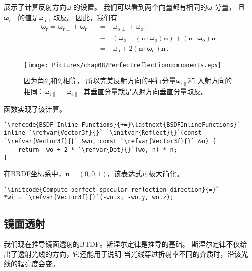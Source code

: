 展示了计算反射方向${\bm\omega}_{\mathrm{r}}$的设置。
我们可以看到两个向量都有相同的${\bm\omega}_{\parallel}$分量，
且${\bm\omega}_{\mathrm{r}\perp}$的值是${\bm\omega}_{\mathrm{o}\perp}$取反。
因此，我们有
\begin{align}
    \label{eq:8.5}
    {\bm\omega}_{\mathrm{r}}={\bm\omega}_{\mathrm{r}\perp}+{\bm\omega}_{\mathrm{r}\parallel} & =-{\bm\omega}_{\mathrm{o}\perp}+{\bm\omega}_{\mathrm{o}\parallel}\nonumber                                                        \\
                                                                                             & =-({\bm\omega}_{\mathrm{o}}-({\bm n}\cdot{\bm\omega}_{\mathrm{o}}){\bm n})+({\bm n}\cdot{\bm\omega}_{\mathrm{o}}){\bm n}\nonumber \\
                                                                                             & =-{\bm\omega}_{\mathrm{o}}+2({\bm n}\cdot{\bm\omega}_{\mathrm{o}}){\bm n}\, .
\end{align}
\begin{figure}[htbp]
    \centering
    \texttt{[image: Pictures/chap08/Perfectreflectioncomponents.eps]}
    \caption{因为角$\theta_{\mathrm{o}}$和$\theta_{\mathrm{r}}$相等，
    所以完美反射方向的平行分量${\bm\omega}_{\mathrm{r}\parallel}$和
    入射方向的相同：${\bm\omega}_{\mathrm{r}\parallel}={\bm\omega}_{\mathrm{o}\parallel}$.
    其垂直分量就是入射方向垂直分量取反。}
    \label{fig:8.8}
\end{figure}

函数实现了该计算。
\begin{lstlisting}
`\refcode{BSDF Inline Functions}{+=}\lastnext{BSDFInlineFunctions}`
inline `\refvar{Vector3f}{}` `\initvar{Reflect}{}`(const `\refvar{Vector3f}{}` &wo, const `\refvar{Vector3f}{}` &n) {
    return -wo + 2 * `\refvar{Dot}{}`(wo, n) * n;
}
\end{lstlisting}

在BRDF坐标系中，${\bm n}=(0,0,1)$，该表达式可极大简化。
\begin{lstlisting}
`\initcode{Compute perfect specular reflection direction}{=}`
*wi = `\refvar{Vector3f}{}`(-wo.x, -wo.y, wo.z);
\end{lstlisting}

\subsection{镜面透射}\label{sub:镜面透射}
我们现在推导镜面透射的BTDF。斯涅尔定律是推导的基础。
斯涅尔定律不仅给出了透射光线的方向，它还能用于说明
当光线穿过折射率不同的介质时，沿该光线的辐亮度会变。


